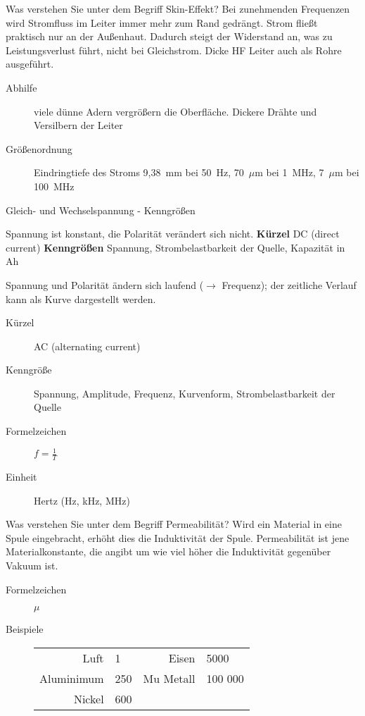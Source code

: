 \documentclass[avery5371,grid,frame,a4paper]{flashcards}
\newcommand{\card}[3]{
  \begin{flashcard}[{\chap} -- #1]{#2}#3\end{flashcard}
}
\begin{document}
\card{08}{Was verstehen Sie unter dem Begriff Skin-Effekt?}{
  \small
  Bei zunehmenden Frequenzen wird Stromfluss im Leiter immer mehr zum Rand gedrängt.
  Strom fließt praktisch nur an der Außenhaut.
  Dadurch steigt der Widerstand an, was zu Leistungsverlust führt, nicht bei Gleichstrom.
  Dicke HF Leiter auch als Rohre ausgeführt.
  \begin{description}
    \item[Abhilfe] viele dünne Adern vergrößern die Oberfläche. Dickere Drähte und Versilbern der Leiter
    \item[Größenordnung] Eindringtiefe des Stroms
      9,38~mm bei 50~Hz, 70~$\mu$m bei 1~MHz, 7~$\mu$m bei 100~MHz
  \end{description}
}

\card{09}{Gleich- und Wechselspannung - Kenngrößen}{
  \scriptsize
  \begin{description}\itemsep0pt
    \item[Gleichspannung] Spannung ist konstant, die Polarität verändert sich nicht. \textbf{Kürzel} DC (direct current) \textbf{Kenngrößen} Spannung, Strombelastbarkeit der Quelle, Kapazität in Ah
    \item[Wechselspannung]\itemsep0pt
      Spannung und Polarität ändern sich laufend ($\rightarrow$ Frequenz); der zeitliche Verlauf kann als Kurve dargestellt werden. 
      \begin{description}
        \item[Kürzel] AC (alternating current)
        \item[Kenngröße] Spannung, Amplitude, Frequenz, Kurvenform, Strombelastbarkeit der Quelle
        \item[Formelzeichen] $f = \frac1T$
        \item[Einheit] Hertz (Hz, kHz, MHz)
      \end{description}
  \end{description}
}


\card{10}{Was verstehen Sie unter dem Begriff Permeabilität?}{
  Wird ein Material in eine Spule eingebracht, erhöht dies die Induktivität der Spule.
  Permeabilität ist jene Materialkonstante, die angibt um wie viel höher die Induktivität
  gegenüber Vakuum ist.
  \begin{description}
    \item[Formelzeichen] $\mu$
    \item[Beispiele]
      \begin{tabular}{rlrl}
        Luft       & 1      & Eisen      & 5000 \\
        Aluminimum & 250    & Mu Metall  & 100 000 \\
        Nickel     & 600    &            & \\
      \end{tabular}
  \end{description}
}
\end{document}
